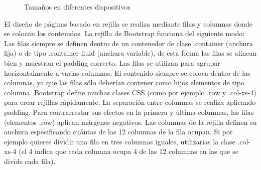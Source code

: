 \documentclass[a4paper, 12pt]{book}
\begin{document}
\begin{figure}[htbp] 
  \label{figura:bootstrap}
  \centering
  \caption{Tama\~nos en diferentes dispositivos}
\end{figure}

El dise\~no de p\'aginas basado en rejilla se realiza mediante filas y columnas donde se colocan los contenidos. La rejilla de Bootstrap funciona del
siguiente modo: Las filas siempre se definen dentro de un contenedor de clase .container (anchura fija) o de tipo .container-fluid (anchura variable), 
de esta forma las filas se alinean bien y muestran el padding correcto. Las filas se utilizan para agrupar horizontalmente a varias columnas. 
El contenido siempre se coloca dentro de las columnas, ya que las filas s\'olo deber\'ian contener como hijos elementos de tipo columna. Bootstrap 
define muchas clases CSS (como por ejemplo .row y .col-xs-4) para crear rejillas r\'apidamente. La separaci\'on entre columnas se realiza aplicando 
padding. Para contrarrestar sus efectos en la primera y \'ultima columnas, las filas (elementos .row) aplican m\'argenes negativos. Las columnas de la 
rejilla definen su anchura especificando cu\'antas de las 12 columnas de la fila ocupan. Si por ejemplo quieres dividir una fila en tres columnas 
iguales, utilizar\'ias la clase .col-xs-4 (el 4 indica que cada columna ocupa 4 de las 12 columnas en las que se divide cada fila).
\end{document}
